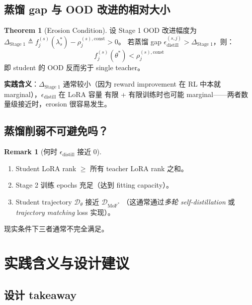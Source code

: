 \documentclass[11pt,a4paper]{article}
\newcommand{\MoF}{\mathrm{MoF}}
\newcommand{\const}{\mathrm{const}}
\theoremstyle{definition}
\newtheorem{remark}{Remark}
\newtheorem{theorem}{Theorem}
\begin{document}
\subsection{蒸馏 gap 与 OOD 改进的相对大小}

\begin{theorem}[Erosion Condition]
\label{thm:erosion}
设 Stage 1 OOD 改进幅度为
$\Delta_{\text{Stage 1}} \triangleq f_j^{(s)}(\lambda_s^*) - \rho_j^{(s),\const} > 0$。
若蒸馏 gap $\epsilon_{\text{distill}}^{(s,j)} > \Delta_{\text{Stage 1}}$，则：
\begin{equation}
f_j^{(s)}(\theta^*) < \rho_j^{(s),\const}
\end{equation}
即 student 的 OOD 反而劣于 single teacher。
\end{theorem}

\textbf{实践含义}：$\Delta_{\text{Stage 1}}$ 通常较小（因为 reward
improvement 在 RL 中本就 marginal），$\epsilon_{\text{distill}}$ 在 LoRA 容量
有限 + 有限训练时也可能 marginal——两者数量级接近时，erosion 很容易发生。

\subsection{蒸馏削弱不可避免吗？}

\begin{remark}[何时 $\epsilon_{\text{distill}}$ 接近 0]
\begin{enumerate}[leftmargin=1.5em]
\item Student LoRA rank $\geq$ 所有 teacher LoRA rank 之和。
\item Stage 2 训练 epochs 充足（达到 fitting capacity）。
\item Student trajectory $\mathcal{D}_\theta$ 接近 $\mathcal{D}_{\MoF^*}$
（这通常通过\emph{多轮 self-distillation} 或 \emph{trajectory matching}
loss 实现）。
\end{enumerate}
现实条件下三者通常不完全满足。
\end{remark}

\section{实践含义与设计建议}
\label{sec:practical}

\subsection{设计 takeaway}
\end{document}
